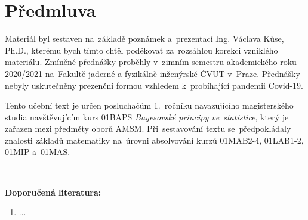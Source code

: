 \chapter*{Předmluva}

Materiál byl sestaven na~základě poznámek a~prezentací Ing. Václava Kůse, Ph.D., kterému bych tímto chtěl poděkovat za~rozsáhlou korekci vzniklého materiálu. Zmíněné přednášky proběhly v~zimním semestru akademického roku 2020/2021 na~Fakultě jaderné a
fyzikálně inženýrské ČVUT v~Praze. Přednášky nebyly uskutečněny prezenční formou vzhledem k~probíhající pandemii Covid-19. 

Tento učební text je určen posluchačům 1.~ročníku navazujícího magisterského studia navštěvujícím kurs 01BAPS\emph{ Bayesovské principy ve~statistice}, který je zařazen
mezi předměty oborů AMSM. Při~sestavování textu se~předpokládaly znalosti základů matematiky na~úrovni absolvování kurzů 01MAB2-4, 01LAB1-2, 01MIP a~01MAS.

~

\textbf{Doporučená literatura:}
\begin{enumerate}[(1)]
  \item ...
\end{enumerate}
